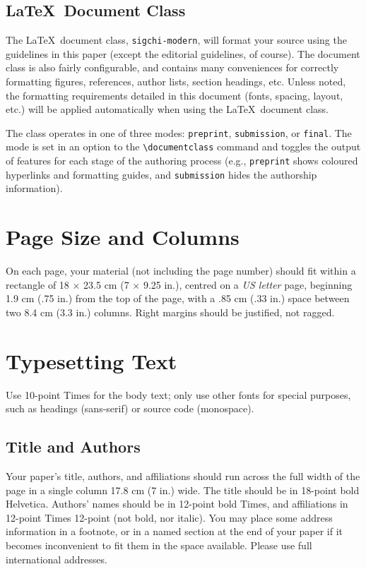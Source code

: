 \documentclass[preprint]{../latex/sigchi-modern}
\begin{document}
\subsection{\LaTeX\ Document Class}
The \LaTeX\ document class, \texttt{sigchi-modern}, will format your source
using the guidelines in this paper (except the editorial guidelines, of course).
The document class is also fairly configurable, and contains many conveniences
for correctly formatting figures, references, author lists, section headings,
etc. Unless noted, the formatting requirements detailed in this document (fonts,
spacing, layout, etc.) will be applied automatically when using the \LaTeX\ 
document class.

The class operates in one of three modes: \texttt{preprint},
\texttt{sub\-mis\-sion}, or \texttt{final}. The mode is set in an option to the
\texttt{\textbackslash documentclass} command and toggles the output of
features for each stage of the authoring process (e.g., \texttt{preprint} shows
coloured hyperlinks and formatting guides, and \texttt{submission} hides the
authorship information).

\section{Page Size and Columns}
On each page, your material (not including the page number) should fit within a
rectangle of 18 $\times$ 23.5 cm (7 $\times$ 9.25 in.), centred on a \textit{US
letter} page, beginning 1.9 cm (.75 in.) from the top of the page, with a .85 cm
(.33 in.) space between two 8.4 cm (3.3 in.) columns. Right margins should be
justified, not ragged.

\section{Typesetting Text}
Use 10-point Times for the body text; only use other fonts for special
purposes, such as headings (sans-serif) or source code (monospace).

\subsection{Title and Authors}
Your paper's title, authors, and affiliations should run across the full width of
the page in a single column 17.8 cm (7 in.) wide. The title should be in
18-point bold Helvetica. Authors' names should be in 12-point bold Times, and
affiliations in 12-point Times 12-point (not bold, nor italic).
You may place some address information in a footnote, or in a named section at
the end of your paper if it becomes inconvenient to fit them in the space
available. Please use full international addresses.
\end{document}
